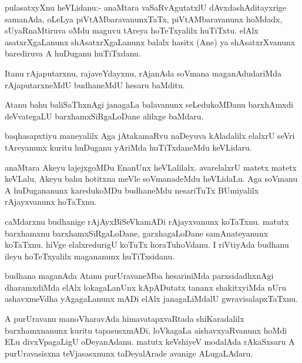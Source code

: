 \documentclass{article}
\begin{document}
\begin{mn}%
pulasatxyXnu heVLidanu:- anaMtara vaSaRvAgutatxlU dAvxdashAditayxrige
samanAda, oLeLya piVtAMbaravanunxTaTx, piVtAMbaravanunx hoMdadx,
sUyaRnaMtiruva oMdu maguvu tAreya hoTeTxyalilx huTiTxtu. elAlx
asatxrXgaLanunx shAsatxrXgaLanunx balalx hasitx (Ane) ya
shAsatxrXvanunx barediruva A huDuganu huTiTxdanu.
\end{mn}

\begin{mn}
Itanu rAjaputarxnu, rajaveYdayxnu, rAjanAda soVmana maganAdudariMda
rAjaputarxneMdU budhaneMdU hesaru baMditu.
\end{mn}

\begin{mn}%
Atanu bahu baliSaThxnAgi janagaLa balavanunx seLedukoMDanu barxhAmxdi
deVvategaLU barxhamxSiRgaLoDane alilxge baMdaru.
\end{mn}

\begin{mn}
baqhasapxtiyu maneyalilx Aga jAtakamaRvu naDeyuva kAladalilx elalxrU
seVri tAreyanunx kuritu huDuganu yAriMda huTiTxdaneMdu keVLidaru.
\end{mn}

\begin{mn}%
anaMtara Akeyu lajejxgoMDu EnanUnx heVLalilalx. avarelalxrU matetx
matetx keVLalu, Akeyu bahu hotitxna meVle soVmanadeMdu heVLidaLu. Aga
soVmanu A huDugananunx karedukoMDu budhaneMdu nesariTuTx BUmiyalilx
rAjayxvanunx hoTaTxnu.
\end{mn}

\begin{mn}
caMdarxnu budhanige rAjAyxBiSeVkamADi rAjayxvanunx koTaTxnu. matutx
barxhamxnu barxhamxSiRgaLoDane, garxhagaLoDane samAnateyanunx
koTaTxnu. hiVge elalxredurigU koTuTx horaTuhoVdanu. I riVtiyAda
budhanu ileyu hoTeTxyalilx magananunx huTiTxsidanu.
\end{mn}

\begin{mn}%
budhana maganAda Atanu purUravaneMba hesariniMda parxsidadhxnAgi
dharamxdiMda elAlx lokagaLanUnx kApADutatx tananx shakitxyiMda nUru
ashavxmeVdha yAgagaLanunx mADi elAlx janagaLiMdalU gwravisalapxTaTxnu.
\end{mn}

\begin{mn}%
A purUravanu manoVharavAda himavatapxvaRtada shiKaradalilx
barxhamxnanunx kuritu tapasusxmADi, loVkagaLa aishavxyaRvanunx hoMdi
ELu divxVpagaLigU oDeyanAdanu. matutx keVshiyeV modalAda rAkaSxsaru A
purUravasisxna teVjasasxnunx taDeyalArade avanige ALugaLAdaru.
\end{mn}
\end{document}
